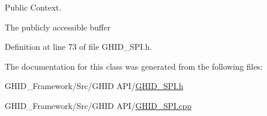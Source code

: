 \-Public \-Context. 

\-The publicly accessible buffer 

\-Definition at line 73 of file \-G\-H\-I\-D\-\_\-\-S\-P\-I.\-h.



\-The documentation for this class was generated from the following files\-:\begin{DoxyCompactItemize}
\item 
\-G\-H\-I\-D\-\_\-\-Framework/\-Src/\-G\-H\-I\-D A\-P\-I/\hyperlink{_g_h_i_d___s_p_i_8h}{\-G\-H\-I\-D\-\_\-\-S\-P\-I.\-h}\item 
\-G\-H\-I\-D\-\_\-\-Framework/\-Src/\-G\-H\-I\-D A\-P\-I/\hyperlink{_g_h_i_d___s_p_i_8cpp}{\-G\-H\-I\-D\-\_\-\-S\-P\-I.\-cpp}\end{DoxyCompactItemize}
